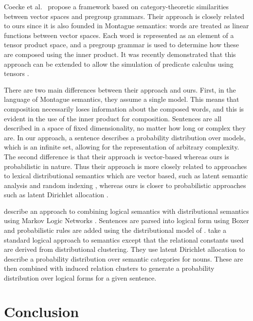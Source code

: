 \documentclass[manuscript]{clv2}
\newcommand{\newcite}[1]{\namecite{#1}}
\begin{document}
Coecke et al.~\cite{Coecke:10} propose a framework based on category-theoretic
similarities between vector spaces and pregroup grammars. Their
approach is closely related to ours since it is also
founded in Montague semantics: words are treated as linear functions
between vector spaces. 
Each word is represented as an element of a
tensor product space, and a pregroup grammar is used to determine how
these are composed using the inner product. It was recently
demonstrated that this approach can be extended to allow the
simulation of predicate calculus using
tensors \cite{Grefenstette:13}.

There are two main differences between their approach and ours. First,
in the language of Montague semantics, they assume a single
model. This means that composition necessarily loses information about
the composed words, and this is evident in the use of the inner
product for composition. Sentences are all described in a space of
fixed dimensionality, no matter how long or complex they are. In our
approach, a sentence describes a probability distribution over models,
which is an infinite set, allowing for the representation of arbitrary
complexity. The second difference is that their approach is vector-based whereas
ours is probabilistic in nature. Thus their approach is more
closely related to approaches to lexical distributional semantics
which are vector based, such as latent semantic analysis
\cite{Deerwester:90} and random indexing \cite{Sahlgren:02}, whereas
ours is closer to probabilistic approaches such as latent Dirichlet
allocation \cite{Blei:03}.

\newcite{Garrette:11} describe an approach to combining logical
semantics with distributional semantics using Markov Logic Networks
\cite{Richardson:06}. Sentences are parsed into logical form using
Boxer \cite{Bos:04} and probabilistic rules are added using the
distributional model of \newcite{Erk:10}. \newcite{Lewis:13} take a standard logical approach to
semantics except that the relational constants used are derived from
distributional clustering. 
They use latent Dirichlet allocation to
describe a probability distribution over semantic categories for
nouns. These are then combined with induced relation clusters to
generate a probability distribution over logical forms for a given
sentence.

\section{Conclusion}
\end{document}

